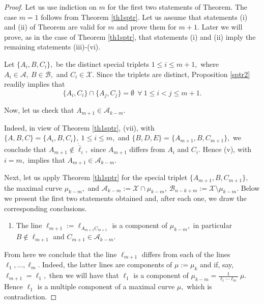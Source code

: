 \documentclass[10pt,a4paper]{amsart}
\newcommand{\Aset}{\mathcal{A}}
\newcommand{\Bset}{\mathcal{B}}
\newcommand{\Xset}{\mathcal{X}}
\begin{document}
\begin{proof}
Let us use indiction on $m$ for the first two statements of Theorem.
The case $m=1$ follows from Theorem \ref{th1sptr}.
Let us assume that statements (i) and (ii) of Theorem are valid for $m$ and prove them for $m+1.$
Later we will prove, as in the case of Theorem \ref{th1sptr}, that statements (i) and (ii) imply the remaining statements (iii)-(vi). 

Let $\{A_i,B,C_i\},$ be the distinct special triplets $1\le i\le m+1,$ where $A_i \in \Aset,\ B\in \Bset,$ and  $C_i \in \Xset.$ 
Since the triplets are distinct, Proposition \ref{sptr2} readily implies that 
\begin{equation*}\label{ACij}\{A_i,C_i\}\cap \{A_j,C_j\}=\emptyset\ \ \forall\ 1\le i<j\le m+1.\end{equation*}

Now, let us check that $A_{m+1}\in \Aset_{k-m}.$

Indeed, in view of  Theorem \ref{th1sptr}, (vii), with $\{A,B,C\}=\{A_i,B,C_i\},\ 1\le i\le m,$ and $\{B,D,E\}=\{A_{m+1},B,C_{m+1}\},$ we conclude that $A_{m+1}\notin \dot{\bar\ell}_i,$ since $A_{m+1}$ differs from $A_i$ and $C_i.$  Hence (v), with $i=m,$ implies that $A_{m+1}\in\Aset_{k-m}.$  


Next, let us apply Theorem \ref{th1sptr} for the special triplet $\{A_{m+1},B,C_{m+1}\},$   the maximal curve $\mu_{k-m},$ and $\Aset_{k-m}:=\Xset\cap\mu_{k-m},\ \Bset_{n-k+m}:=\Xset\setminus\mu_{k-m}.$
Below we present the first two statements obtained and, after each one, we draw the corresponding conclusions.
\begin{enumerate}[label*=\arabic*.]
\setcounter{enumi}{0}
\setlength{\itemsep}{0mm}
\item
The line $\ell_{m+1}:=\ell_{A_{m+1}C_{m+1}}$ is a component of $\mu_{k-m},$ in particular $B\notin\ell_{m+1}$ and $C_{m+1}\in \Aset_{k-m}.$ 
\end{enumerate}
From here we conclude that the line $\ell_{m+1}$ differs from each of the lines
$\ell_1, \ldots,\ell_m.$ Indeed, the latter lines are components of $\mu:=\mu_k$ and if, say, $\ell_{m+1}=\ell_1,$ then we will have that $\ell_1$ is a component of $\mu_{k-m}=\frac{1}{\ell_1\cdots\ell_m}\ \mu.$ Hence $\ell_1$ is a multiple component of a maximal curve $\mu,$ which is contradiction.


\end{proof}
\end{document}
